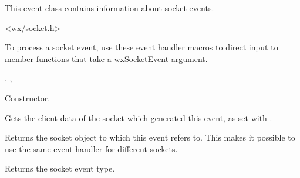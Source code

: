 This event class contains information about socket events.




<wx/socket.h>


To process a socket event, use these event handler macros to direct input
to member functions that take a wxSocketEvent argument.

\twocolwidtha{7cm}
\begin{twocollist}\itemsep=0pt
\end{twocollist}


, 
, 


\label{wxsocketeventctor}


Constructor.

\label{wxsocketeventgetclientdata}


Gets the client data of the socket which generated this event, as
set with .

\label{wxsocketeventgetsocket}


Returns the socket object to which this event refers to. This makes
it possible to use the same event handler for different sockets.

\label{wxsocketeventgetsocketevent}


Returns the socket event type.

